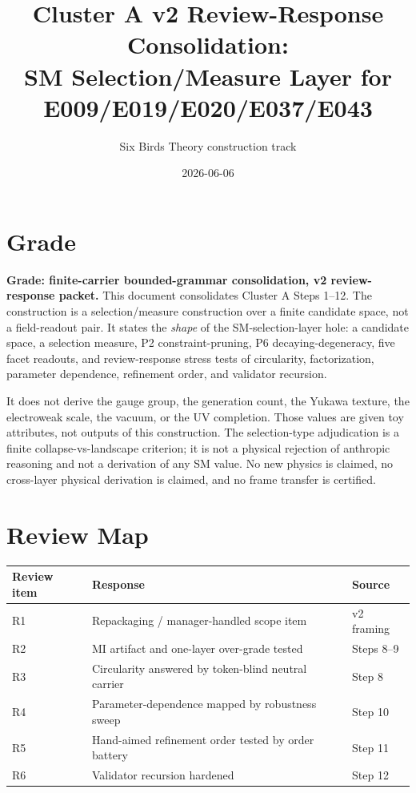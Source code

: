 \documentclass[11pt]{article}
\title{Cluster A v2 Review-Response Consolidation:\\SM Selection/Measure Layer for E009/E019/E020/E037/E043}
\author{Six Birds Theory construction track}
\date{2026-06-06}
\begin{document}
\maketitle

\section{Grade}

\textbf{Grade: finite-carrier bounded-grammar consolidation, v2 review-response packet.}
This document consolidates Cluster A Steps 1--12. The construction is a selection/measure construction over a finite candidate space, not a field-readout pair. It states the \emph{shape} of the SM-selection-layer hole: a candidate space, a selection measure, P2 constraint-pruning, P6 decaying-degeneracy, five facet readouts, and review-response stress tests of circularity, factorization, parameter dependence, refinement order, and validator recursion.

It does not derive the gauge group, the generation count, the Yukawa texture, the electroweak scale, the vacuum, or the UV completion. Those values are given toy attributes, not outputs of this construction. The selection-type adjudication is a finite collapse-vs-landscape criterion; it is not a physical rejection of anthropic reasoning and not a derivation of any SM value. No new physics is claimed, no cross-layer physical derivation is claimed, and no frame transfer is certified.

\section{Review Map}

\begin{center}
\begin{tabular}{lll}
\toprule
Review item & Response & Source \\
\midrule
R1 & Repackaging / manager-handled scope item & v2 framing \\
R2 & MI artifact and one-layer over-grade tested & Steps 8--9 \\
R3 & Circularity answered by token-blind neutral carrier & Step 8 \\
R4 & Parameter-dependence mapped by robustness sweep & Step 10 \\
R5 & Hand-aimed refinement order tested by order battery & Step 11 \\
R6 & Validator recursion hardened & Step 12 \\
\bottomrule
\end{tabular}
\end{center}
\end{document}
